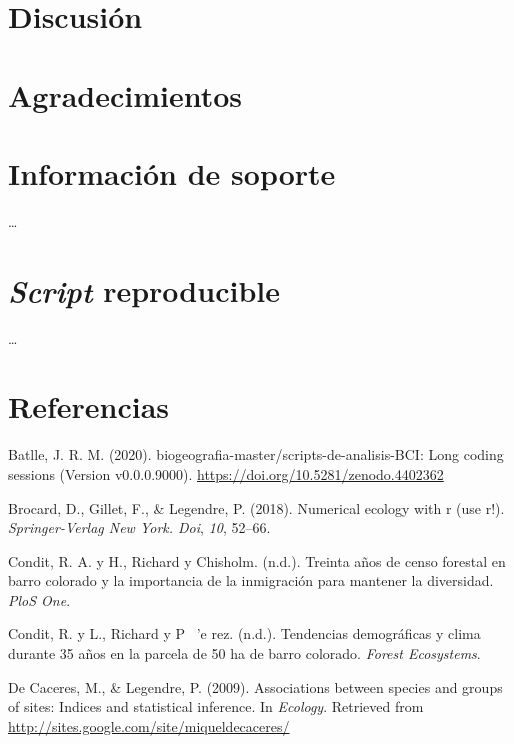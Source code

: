 \documentclass[11pt,]{article}
\begin{document}
\section{Discusión}\label{discusiuxf3n}

\section{Agradecimientos}\label{agradecimientos}

\section{Información de soporte}\label{informaciuxf3n-de-soporte}

\ldots

\section{\texorpdfstring{\emph{Script}
reproducible}{Script reproducible}}\label{script-reproducible}

\ldots

\section*{Referencias}\label{referencias}

\hypertarget{refs}{}
\hypertarget{ref-jose_ramon_martinez_batlle_2020_4402362}{}
Batlle, J. R. M. (2020). biogeografia-master/scripts-de-analisis-BCI:
Long coding sessions (Version v0.0.0.9000).
\url{https://doi.org/10.5281/zenodo.4402362}

\hypertarget{ref-brocard2011numerical}{}
Brocard, D., Gillet, F., \& Legendre, P. (2018). Numerical ecology with
r (use r!). \emph{Springer-Verlag New York. Doi}, \emph{10}, 52--66.

\hypertarget{ref-condit2012thirty}{}
Condit, R. A. y H., Richard y Chisholm. (n.d.). Treinta años de censo
forestal en barro colorado y la importancia de la inmigración para
mantener la diversidad. \emph{PloS One}.

\hypertarget{ref-condit2017demographic}{}
Condit, R. y L., Richard y P ~'e rez. (n.d.). Tendencias demográficas y
clima durante 35 años en la parcela de 50 ha de barro colorado.
\emph{Forest Ecosystems}.

\hypertarget{ref-indicspecies}{}
De Caceres, M., \& Legendre, P. (2009). Associations between species and
groups of sites: Indices and statistical inference. In \emph{Ecology}.
Retrieved from \url{http://sites.google.com/site/miqueldecaceres/}
\end{document}
